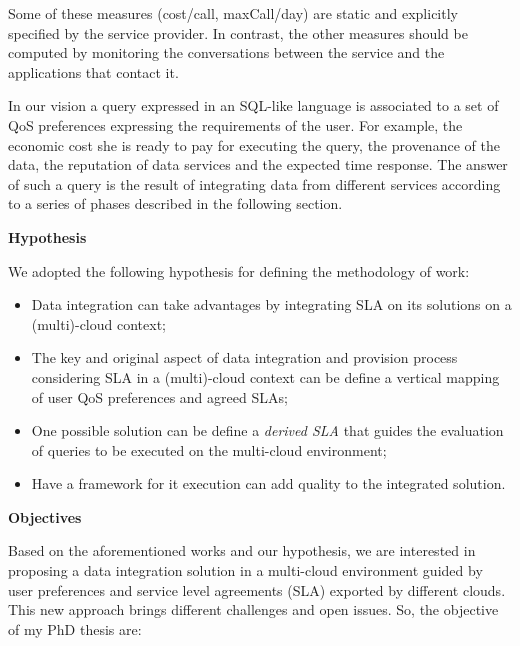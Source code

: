 \documentclass[12pt,a4paper,oneside]{report}
\begin{document}


Some of these measures ({\sf cost/call, maxCall/day}) are static and explicitly specified by the service provider. 
In contrast, the other measures should be computed by monitoring the conversations between the service and the applications that contact it.  

In our vision a query expressed in an SQL-like language is associated to a set of QoS preferences expressing the requirements of the user. For example, the economic cost she is ready to pay for executing the query, the provenance of the data, the reputation of data services and the expected time response. The answer of such a query is the result of integrating data from different services according to a series of phases described in the following section.


\begin{flushleft}
\textbf{Hypothesis}\\
\end{flushleft}

We adopted the following hypothesis for defining the methodology of work:

\begin{itemize}
   \item Data integration can take advantages by integrating SLA on its solutions on a (multi)-cloud context;
   \item The key and original aspect of data integration and provision process considering SLA in a (multi)-cloud context can be define a vertical mapping of user QoS preferences and agreed SLAs; 
   \item One possible solution can be define a {\em derived SLA} that guides the evaluation of queries to be executed on the multi-cloud environment; 
   \item Have a framework for it execution can add quality to the integrated solution.

\end{itemize}

\begin{flushleft}
\textbf{Objectives}\\
\end{flushleft}

Based on the aforementioned works and our hypothesis, we are interested in proposing a data integration solution in a multi-cloud environment guided by user preferences and service level agreements (SLA) exported by different clouds. This new approach brings different challenges and open issues. So, the objective of my PhD thesis are:
\end{document}
